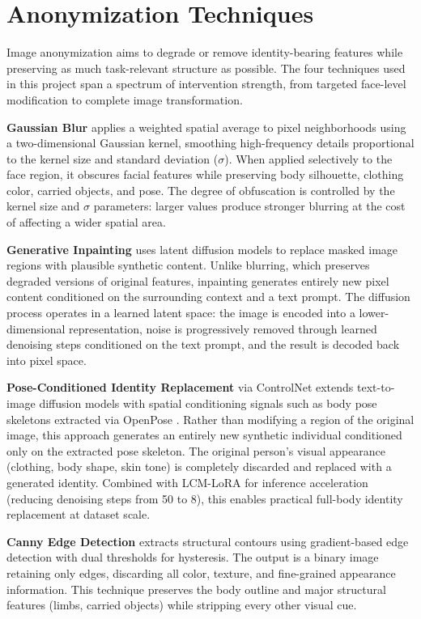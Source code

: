 \section{Anonymization Techniques}

Image anonymization aims to degrade or remove identity-bearing features while preserving as much task-relevant structure as possible. The four techniques used in this project span a spectrum of intervention strength, from targeted face-level modification to complete image transformation.

\textbf{Gaussian Blur} applies a weighted spatial average to pixel neighborhoods using a two-dimensional Gaussian kernel, smoothing high-frequency details proportional to the kernel size and standard deviation ($\sigma$). When applied selectively to the face region, it obscures facial features while preserving body silhouette, clothing color, carried objects, and pose. The degree of obfuscation is controlled by the kernel size and $\sigma$ parameters: larger values produce stronger blurring at the cost of affecting a wider spatial area.

\textbf{Generative Inpainting} uses latent diffusion models \cite{rombach2022ldm} to replace masked image regions with plausible synthetic content. Unlike blurring, which preserves degraded versions of original features, inpainting generates entirely new pixel content conditioned on the surrounding context and a text prompt. The diffusion process operates in a learned latent space: the image is encoded into a lower-dimensional representation, noise is progressively removed through learned denoising steps conditioned on the text prompt, and the result is decoded back into pixel space.

\textbf{Pose-Conditioned Identity Replacement} via ControlNet \cite{zhang2023controlnet} extends text-to-image diffusion models with spatial conditioning signals such as body pose skeletons extracted via OpenPose \cite{cao2017openpose}. Rather than modifying a region of the original image, this approach generates an entirely new synthetic individual conditioned only on the extracted pose skeleton. The original person's visual appearance (clothing, body shape, skin tone) is completely discarded and replaced with a generated identity. Combined with LCM-LoRA \cite{luo2023lcm} for inference acceleration (reducing denoising steps from 50 to 8), this enables practical full-body identity replacement at dataset scale.

\textbf{Canny Edge Detection} \cite{canny1986edge} extracts structural contours using gradient-based edge detection with dual thresholds for hysteresis. The output is a binary image retaining only edges, discarding all color, texture, and fine-grained appearance information. This technique preserves the body outline and major structural features (limbs, carried objects) while stripping every other visual cue.


